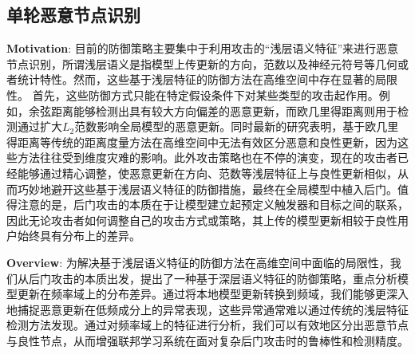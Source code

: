 \documentclass[lettersize,journal]{IEEEtran}
\begin{document}
\subsection{单轮恶意节点识别}
\textbf{Motivation}: 目前的防御策略主要集中于利用攻击的“浅层语义特征”来进行恶意节点识别，所谓浅层语义是指模型上传更新的方向，范数以及神经元符号等几何或者统计特性。然而，这些基于浅层特征的防御方法在高维空间中存在显著的局限性。
首先，这些防御方式只能在特定假设条件下对某些类型的攻击起作用。例如，余弦距离能够检测出具有较大方向偏差的恶意更新，而欧几里得距离则用于检测通过扩大$L_2$范数影响全局模型的恶意更新。同时最新的研究表明，基于欧几里得距离等传统的距离度量方法在高维空间中无法有效区分恶意和良性更新，因为这些方法往往受到维度灾难的影响。此外攻击策略也在不停的演变，现在的攻击者已经能够通过精心调整，使恶意更新在方向、范数等浅层特征上与良性更新相似，从而巧妙地避开这些基于浅层语义特征的防御措施，最终在全局模型中植入后门。值得注意的是，后门攻击的本质在于让模型建立起预定义触发器和目标之间的联系，因此无论攻击者如何调整自己的攻击方式或策略，其上传的模型更新相较于良性用户始终具有分布上的差异。

\textbf{Overview}: 为解决基于浅层语义特征的防御方法在高维空间中面临的局限性，我们从后门攻击的本质出发，提出了一种基于深层语义特征的防御策略，重点分析模型更新在频率域上的分布差异。通过将本地模型更新转换到频域，我们能够更深入地捕捉恶意更新在低频成分上的异常表现，这些异常通常难以通过传统的浅层特征检测方法发现。通过对频率域上的特征进行分析，我们可以有效地区分出恶意节点与良性节点，从而增强联邦学习系统在面对复杂后门攻击时的鲁棒性和检测精度。
\end{document}
